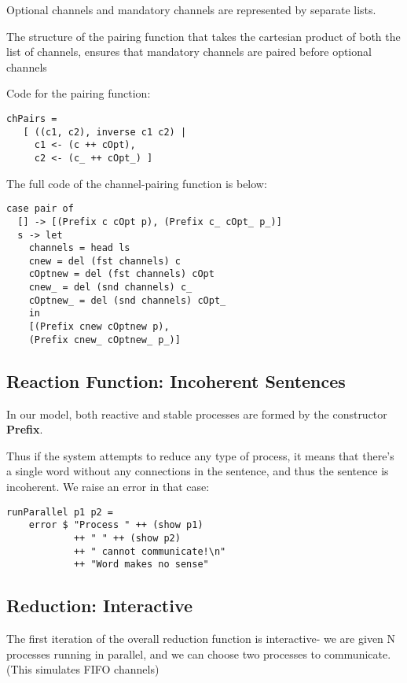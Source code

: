 \documentclass{article}
\begin{document}
Optional channels and mandatory channels are represented by separate lists.

The structure of the pairing function that takes the cartesian product of both the list of channels, ensures that mandatory channels are paired before optional channels

Code for the pairing function:

\begin{lstlisting}
chPairs = 
   [ ((c1, c2), inverse c1 c2) | 
     c1 <- (c ++ cOpt), 
     c2 <- (c_ ++ cOpt_) ]
\end{lstlisting}

The full code of the channel-pairing function is below:

\begin{lstlisting}
case pair of
  [] -> [(Prefix c cOpt p), (Prefix c_ cOpt_ p_)]
  s -> let
    channels = head ls
    cnew = del (fst channels) c
    cOptnew = del (fst channels) cOpt
    cnew_ = del (snd channels) c_
    cOptnew_ = del (snd channels) cOpt_
    in
    [(Prefix cnew cOptnew p), 
    (Prefix cnew_ cOptnew_ p_)]
\end{lstlisting}


\subsection{Reaction Function: Incoherent Sentences}

In our model, both reactive and stable processes are formed by the constructor \textbf{Prefix}.

Thus if the system attempts to reduce any type of process, it means that there's a single
word without any connections in the sentence, and thus the sentence is incoherent. We raise
an error in that case:  

\begin{lstlisting}
runParallel p1 p2 = 
	error $ "Process " ++ (show p1) 
            ++ " " ++ (show p2)
            ++ " cannot communicate!\n"
            ++ "Word makes no sense" 
\end{lstlisting}


\subsection{Reduction: Interactive}

The first iteration of the overall reduction function is interactive- we are given N processes running in parallel, and we can choose two processes to communicate. (This simulates FIFO channels)
\end{document}
